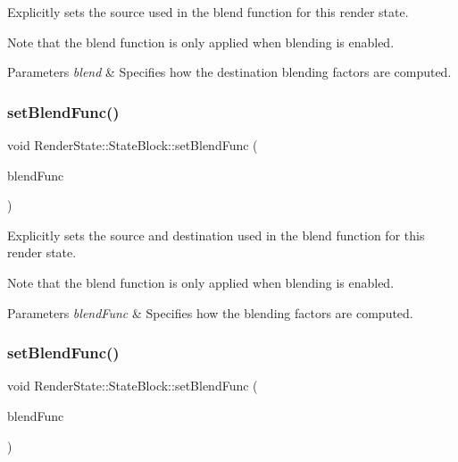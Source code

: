 Explicitly sets the source used in the blend function for this render state.

Note that the blend function is only applied when blending is enabled.


\begin{DoxyParams}{Parameters}
{\em blend} & Specifies how the destination blending factors are computed. \\
\hline
\end{DoxyParams}
\mbox{\label{classRenderState_1_1StateBlock_a68e05f7ba5e689c06d584bf714cecb61}} 
\subsubsection{\texorpdfstring{set\+Blend\+Func()}{setBlendFunc()}\hspace{0.1cm}{\footnotesize\ttfamily [1/2]}}
{\footnotesize\ttfamily void Render\+State\+::\+State\+Block\+::set\+Blend\+Func (\begin{DoxyParamCaption}\item[{const \hyperlink{structBlendFunc}{Blend\+Func} \&}]{blend\+Func }\end{DoxyParamCaption})}

Explicitly sets the source and destination used in the blend function for this render state.

Note that the blend function is only applied when blending is enabled.


\begin{DoxyParams}{Parameters}
{\em blend\+Func} & Specifies how the blending factors are computed. \\
\hline
\end{DoxyParams}
\mbox{\label{classRenderState_1_1StateBlock_a68e05f7ba5e689c06d584bf714cecb61}} 
\subsubsection{\texorpdfstring{set\+Blend\+Func()}{setBlendFunc()}\hspace{0.1cm}{\footnotesize\ttfamily [2/2]}}
{\footnotesize\ttfamily void Render\+State\+::\+State\+Block\+::set\+Blend\+Func (\begin{DoxyParamCaption}\item[{const \hyperlink{structBlendFunc}{Blend\+Func} \&}]{blend\+Func }\end{DoxyParamCaption})}

